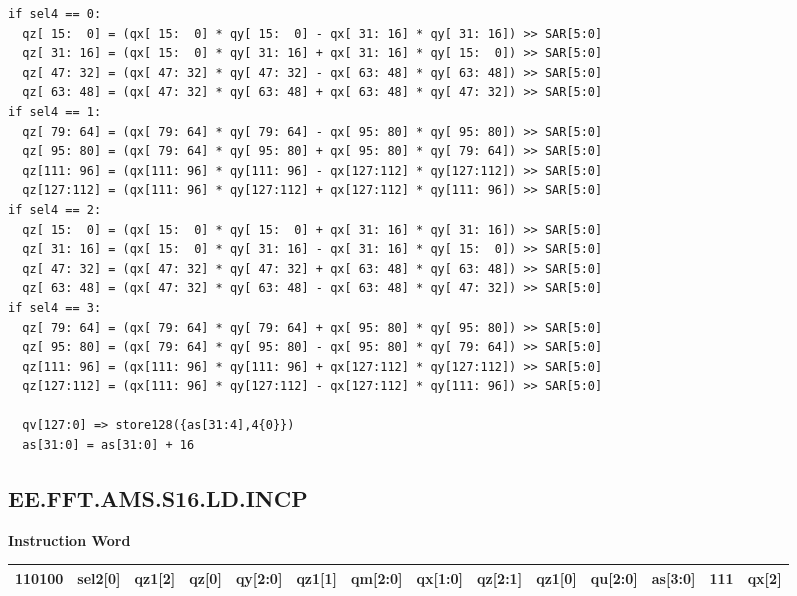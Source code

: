 \begin{lstlisting}
if sel4 == 0:
  qz[ 15:  0] = (qx[ 15:  0] * qy[ 15:  0] - qx[ 31: 16] * qy[ 31: 16]) >> SAR[5:0]
  qz[ 31: 16] = (qx[ 15:  0] * qy[ 31: 16] + qx[ 31: 16] * qy[ 15:  0]) >> SAR[5:0]
  qz[ 47: 32] = (qx[ 47: 32] * qy[ 47: 32] - qx[ 63: 48] * qy[ 63: 48]) >> SAR[5:0]
  qz[ 63: 48] = (qx[ 47: 32] * qy[ 63: 48] + qx[ 63: 48] * qy[ 47: 32]) >> SAR[5:0]
if sel4 == 1:
  qz[ 79: 64] = (qx[ 79: 64] * qy[ 79: 64] - qx[ 95: 80] * qy[ 95: 80]) >> SAR[5:0]
  qz[ 95: 80] = (qx[ 79: 64] * qy[ 95: 80] + qx[ 95: 80] * qy[ 79: 64]) >> SAR[5:0]
  qz[111: 96] = (qx[111: 96] * qy[111: 96] - qx[127:112] * qy[127:112]) >> SAR[5:0]
  qz[127:112] = (qx[111: 96] * qy[127:112] + qx[127:112] * qy[111: 96]) >> SAR[5:0]
if sel4 == 2:
  qz[ 15:  0] = (qx[ 15:  0] * qy[ 15:  0] + qx[ 31: 16] * qy[ 31: 16]) >> SAR[5:0]
  qz[ 31: 16] = (qx[ 15:  0] * qy[ 31: 16] - qx[ 31: 16] * qy[ 15:  0]) >> SAR[5:0]
  qz[ 47: 32] = (qx[ 47: 32] * qy[ 47: 32] + qx[ 63: 48] * qy[ 63: 48]) >> SAR[5:0]
  qz[ 63: 48] = (qx[ 47: 32] * qy[ 63: 48] - qx[ 63: 48] * qy[ 47: 32]) >> SAR[5:0]
if sel4 == 3:
  qz[ 79: 64] = (qx[ 79: 64] * qy[ 79: 64] + qx[ 95: 80] * qy[ 95: 80]) >> SAR[5:0]
  qz[ 95: 80] = (qx[ 79: 64] * qy[ 95: 80] - qx[ 95: 80] * qy[ 79: 64]) >> SAR[5:0]
  qz[111: 96] = (qx[111: 96] * qy[111: 96] + qx[127:112] * qy[127:112]) >> SAR[5:0]
  qz[127:112] = (qx[111: 96] * qy[127:112] - qx[127:112] * qy[111: 96]) >> SAR[5:0]

  qv[127:0] => store128({as[31:4],4{0}})
  as[31:0] = as[31:0] + 16
\end{lstlisting}

\clearpage
\subsection{EE.FFT.AMS.S16.LD.INCP}\label{instruction:EEFFTAMSS16LDINCP}
\setlength\tabcolsep{5pt}
\textbf{Instruction Word} \\
\begin{tabular}{|c|c|c|c|c|c|c|c|c|c|c|c|c|c|}
	\hline
	110100 & sel2[0] & qz1[2] & qz[0] & qy[2:0] & qz1[1] & qm[2:0] & qx[1:0] & qz[2:1] & qz1[0] & qu[2:0] & as[3:0] & 111 & qx[2] \\
	\hline
\end{tabular}

